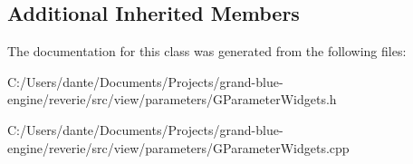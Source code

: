\subsection*{Additional Inherited Members}


The documentation for this class was generated from the following files\+:\begin{DoxyCompactItemize}
\item 
C\+:/\+Users/dante/\+Documents/\+Projects/grand-\/blue-\/engine/reverie/src/view/parameters/G\+Parameter\+Widgets.\+h\item 
C\+:/\+Users/dante/\+Documents/\+Projects/grand-\/blue-\/engine/reverie/src/view/parameters/G\+Parameter\+Widgets.\+cpp\end{DoxyCompactItemize}
